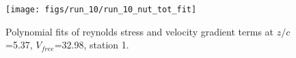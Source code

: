 \begin{figure}[H]
\centering
\texttt{[image: figs/run\_10/run\_10\_nut\_tot\_fit]}
\caption{Polynomial fits of reynolds stress and velocity gradient terms at $z/c$=5.37, $V_{free}$=32.98, station 1.}
\label{fig:run_10_nut_tot_fit}
\end{figure}


